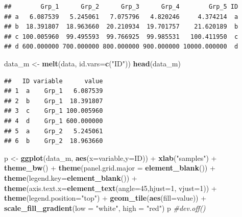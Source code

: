 \documentclass[]{article}
\newenvironment{Shaded}{\begin{snugshade}}{\end{snugshade}}
\newcommand{\KeywordTok}[1]{\textcolor[rgb]{0.13,0.29,0.53}{\textbf{{#1}}}}
\newcommand{\DataTypeTok}[1]{\textcolor[rgb]{0.13,0.29,0.53}{{#1}}}
\newcommand{\DecValTok}[1]{\textcolor[rgb]{0.00,0.00,0.81}{{#1}}}
\newcommand{\StringTok}[1]{\textcolor[rgb]{0.31,0.60,0.02}{{#1}}}
\newcommand{\CommentTok}[1]{\textcolor[rgb]{0.56,0.35,0.01}{\textit{{#1}}}}
\newcommand{\NormalTok}[1]{{#1}}
\numberwithin{figure}{section}
\numberwithin{table}{section}
\theoremstyle{definition}
\theoremstyle{definition}
\theoremstyle{definition}
\theoremstyle{remark}
\begin{document}
\begin{verbatim}
##        Grp_1      Grp_2      Grp_3      Grp_4        Grp_5 ID
## a   6.087539   5.245061   7.075796   4.820246     4.374214  a
## b  18.391807  18.963660  20.210934  19.701757    21.620189  b
## c 100.005960  99.495593  99.766925  99.985531   100.411950  c
## d 600.000000 700.000000 800.000000 900.000000 10000.000000  d
\end{verbatim}

\begin{Shaded}
\begin{Highlighting}[]
\NormalTok{data_m <-}\StringTok{ }\KeywordTok{melt}\NormalTok{(data, }\DataTypeTok{id.vars=}\KeywordTok{c}\NormalTok{(}\StringTok{"ID"}\NormalTok{))}
\KeywordTok{head}\NormalTok{(data_m)}
\end{Highlighting}
\end{Shaded}

\begin{verbatim}
##   ID variable      value
## 1  a    Grp_1   6.087539
## 2  b    Grp_1  18.391807
## 3  c    Grp_1 100.005960
## 4  d    Grp_1 600.000000
## 5  a    Grp_2   5.245061
## 6  b    Grp_2  18.963660
\end{verbatim}

\begin{Shaded}
\begin{Highlighting}[]
\NormalTok{p <-}\StringTok{ }\KeywordTok{ggplot}\NormalTok{(data_m, }\KeywordTok{aes}\NormalTok{(}\DataTypeTok{x=}\NormalTok{variable,}\DataTypeTok{y=}\NormalTok{ID)) +}\StringTok{ }\KeywordTok{xlab}\NormalTok{(}\StringTok{"samples"}\NormalTok{) +}\StringTok{ }\KeywordTok{theme_bw}\NormalTok{() +}\StringTok{ }
\StringTok{    }\KeywordTok{theme}\NormalTok{(}\DataTypeTok{panel.grid.major =} \KeywordTok{element_blank}\NormalTok{()) +}\StringTok{ }\KeywordTok{theme}\NormalTok{(}\DataTypeTok{legend.key=}\KeywordTok{element_blank}\NormalTok{()) +}\StringTok{ }
\StringTok{    }\KeywordTok{theme}\NormalTok{(}\DataTypeTok{axis.text.x=}\KeywordTok{element_text}\NormalTok{(}\DataTypeTok{angle=}\DecValTok{45}\NormalTok{,}\DataTypeTok{hjust=}\DecValTok{1}\NormalTok{, }\DataTypeTok{vjust=}\DecValTok{1}\NormalTok{)) +}\StringTok{ }
\StringTok{    }\KeywordTok{theme}\NormalTok{(}\DataTypeTok{legend.position=}\StringTok{"top"}\NormalTok{) +}\StringTok{  }\KeywordTok{geom_tile}\NormalTok{(}\KeywordTok{aes}\NormalTok{(}\DataTypeTok{fill=}\NormalTok{value)) +}\StringTok{ }
\StringTok{    }\KeywordTok{scale_fill_gradient}\NormalTok{(}\DataTypeTok{low =} \StringTok{"white"}\NormalTok{, }\DataTypeTok{high =} \StringTok{"red"}\NormalTok{)}
\NormalTok{p}
\CommentTok{#dev.off()}
\end{Highlighting}
\end{Shaded}
\end{document}
